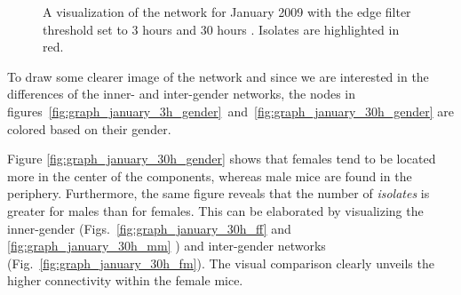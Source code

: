 \begin{figure}[htpb]%
	\centering 
	\qquad 
	\caption[Network visualizations with different edge filter thresholds]{A visualization of the network for January 2009 with the edge filter threshold set to 3 hours  and 30 hours . Isolates are highlighted in red.}  
	 
\end{figure}   

\clearpage

To draw some clearer image of the network and since we are interested in the differences of the inner- and inter-gender networks, the nodes in figures~\ref{fig:graph_january_3h_gender}~and~\ref{fig:graph_january_30h_gender} are colored based on their gender.

Figure \ref{fig:graph_january_30h_gender} shows that females tend to be located more in the center of the components, whereas male mice are found in the periphery. Furthermore, the same figure reveals that the number of \textit{isolates} is greater for males than for females. This can be elaborated by visualizing the inner-gender (Figs.~\ref{fig:graph_january_30h_ff} and \ref{fig:graph_january_30h_mm} ) and inter-gender networks (Fig.~\ref{fig:graph_january_30h_fm}). The visual comparison clearly unveils the higher connectivity within the female mice.

